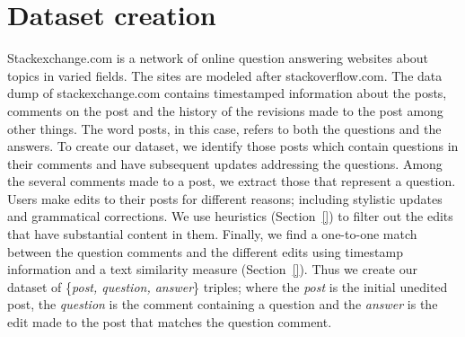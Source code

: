 \documentclass[11pt]{article}
\begin{document}

\iffalse
- a question can have many answers, we don't know what the answer is, but we know that information is missing
- neural models for machine comprehension (neural readers)
- explain how is VPI calculated 
- model that calculates the utility of the post -- we can use a large set of updated vs non-updated posts
- cite regina's work - best matching algorithm (BM25) from information retrieval to get similar posts
- we show that we can train two different models when we have varied amount of training data? (ask Hal)
- Using this idea we make the decision of whether to ask a question or not and the decision of which question when answered would increase the expected utility of a given text; where the expectation is over all possible answers to the question. 


- We model our task as whether we can ask such clarifying questions to the post.  We pick the question that maximizes the expected utility of the post
- We take inspiration from value of perfect information in AI and introduce a neural network model 
\fi

\section{Dataset creation}\label{dataset}

Stackexchange.com is a network of online question answering websites about topics in varied fields. The sites are modeled after stackoverflow.com. The data dump of stackexchange.com contains timestamped information about the posts, comments on the post and the history of the revisions made to the post among other things. The word posts, in this case, refers to both the questions and the answers. To create our dataset, we identify those posts which contain questions in their comments and have subsequent updates addressing the questions. Among the several comments made to a post, we extract those that represent a question. Users make edits to their posts for different reasons; including stylistic updates and grammatical corrections. We use heuristics (Section~\ref{}) to filter out the edits that have substantial content in them. Finally, we find a one-to-one match between the question comments and the different edits using timestamp information and a text similarity measure (Section~\ref{}). Thus we create our dataset of \{\textit{post, question, answer}\} triples; where the \textit{post} is the initial unedited post, the \textit{question} is the comment containing a question and the \textit{answer} is the edit made to the post that matches the question comment. 
\end{document}
